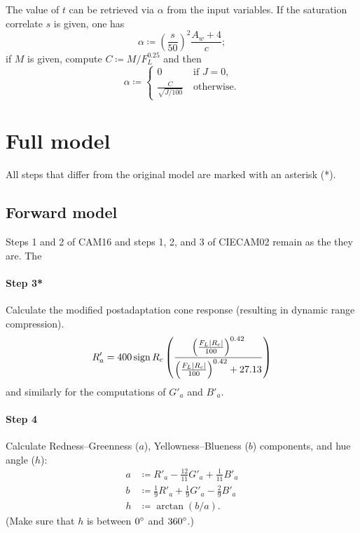 \documentclass[twocolumn]{scrartcl}
\theoremstyle{named}
\DeclarePairedDelimiter\abs{\lvert}{\rvert}%
\DeclareMathOperator{\sign}{sign}
\begin{document}
The value of $t$ can be retrieved via $\alpha$ from the input variables.
If the saturation correlate $s$ is given, one has
\[
  \alpha \coloneqq {\left(\frac{s}{50}\right)}^2 \frac{A_w+4}{c};
\]
if $M$ is given, compute $C\coloneqq M / F_L^{0.25}$ and then
\[
\alpha\coloneqq\begin{cases}
  0 &\:\text{if $J=0$,}\\
  \frac{C}{\sqrt{J/100}}&\:\text{otherwise}.
\end{cases}\]


\section{Full model}

All steps that differ from the original model are marked with an asterisk (*).

\subsection{Forward model}

Steps 1 and 2 of CAM16 and steps 1, 2, and 3 of CIECAM02 remain as the they are.
The

\paragraph{Step 3*}{%
Calculate the modified postadaptation cone response
(resulting in dynamic range compression).
\[
  R'_a = 400 \sign{R_c} \left(\frac{\left(\frac{F_L \abs{R_c}}{100}\right)^{0.42}}{\left(\frac{F_L \abs{R_c}}{100}\right)^{0.42} + 27.13}\right)
\]
and similarly for the computations of $G'_a$ and $B'_a$.
}

\paragraph{Step 4}{%
  Calculate Redness--Greenness ($a$), Yellowness--Blueness ($b$) components,
  and hue angle ($h$):
  \begin{align*}
    a&\coloneqq R'_a - \tfrac{12}{11} G'_a + \tfrac{1}{11} B'_a\\
    b&\coloneqq \tfrac{1}{9} R'_a + \tfrac{1}{9} G'_a - \tfrac{2}{9} B'_a\\
    h&\coloneqq \arctan(b/a).
  \end{align*}
  (Make sure that $h$ is between $0\degree$ and $360\degree$.)
}
\end{document}
